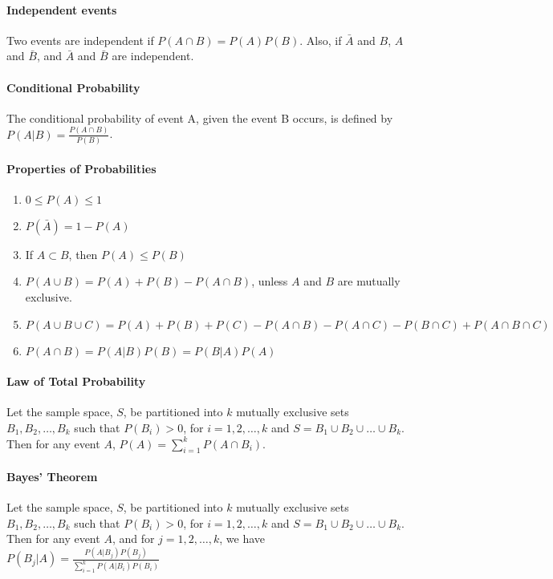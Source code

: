 \documentclass[10pt,letter]{article}
\begin{document}
\paragraph{Independent events}
Two events are independent if $P(A\cap B)=P(A)P(B)$. Also, if $\bar A$ and $B$, $A$ and $\bar B$, and $\bar A$ and $\bar B$ are independent. 

\paragraph{Conditional Probability}
The conditional probability of event A, given the event B occurs, is defined by $P(A|B)=\frac{P(A\cap B)}{P(B)}$.

\paragraph{Properties of Probabilities}
\begin{enumerate}
    \item $0\leq P(A)\leq 1$
    \item $P(\bar A)=1 - P(A)$
    \item If $A\subset B$, then $P(A)\leq P(B)$
    \item $P(A\cup B)=P(A)+P(B)-P(A\cap B)$, unless $A$ and $B$ are mutually exclusive. 
    \item $P(A\cup B\cup C)=P(A)+P(B)+P(C)-P(A\cap B)-P(A\cap C)-P(B\cap C)+P(A\cap B\cap C)$
    \item $P(A\cap B)=P(A|B)P(B)=P(B|A)P(A)$
\end{enumerate}

\paragraph{Law of Total Probability}
Let the sample space, $S$, be partitioned into $k$ mutually exclusive sets $B_1,B_2,\ldots,B_k$ such that $P(B_i)>0$, for $i=1,2,\ldots,k$ and $S=B_1\cup B_2\cup \ldots \cup B_k$. Then for any event $A$, $P(A)=\sum_{i=1}^kP(A\cap B_i)$. 

\paragraph{Bayes' Theorem}
Let the sample space, $S$, be partitioned into $k$ mutually exclusive sets $B_1,B_2,\ldots,B_k$ such that $P(B_i)>0$, for $i=1,2,\ldots,k$ and $S=B_1\cup B_2\cup \ldots \cup B_k$. Then for any event $A$, and for $j=1,2,\ldots,k$, we have $P(B_j|A)=\frac{P(A|B_j)P(B_j)}{\sum_{i=1}^kP(A|B_i)P(B_i)}$
\end{document}
